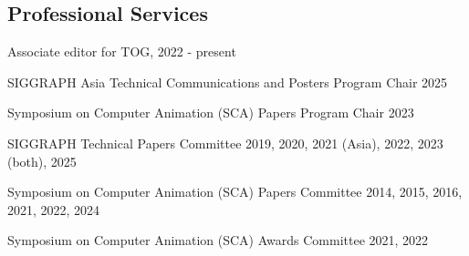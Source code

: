 \documentclass[margin,line]{res}
\newenvironment{list2}{
  \begin{list}{$\bullet$}{%
      \setlength{\itemsep}{0in}
      \setlength{\parsep}{0in} \setlength{\parskip}{0in}
      \setlength{\topsep}{0in} \setlength{\partopsep}{0in} 
      \setlength{\leftmargin}{0.2in}}}{\end{list}}
\begin{document}
\begin{resume}



\section{\sc Professional Services}
Associate editor for TOG, 2022 - present

\vspace*{-.15in}
SIGGRAPH Asia Technical Communications and Posters Program Chair 2025

\vspace*{-.15in}
Symposium on Computer Animation (SCA) Papers Program Chair 2023

\vspace*{-.15in}
SIGGRAPH Technical Papers Committee 2019, 2020, 2021 (Asia), 2022, 2023 (both), 2025

\vspace*{-.15in}
Symposium on Computer Animation (SCA) Papers Committee 2014, 2015, 2016, 2021, 2022, 2024

\vspace*{-.15in}
Symposium on Computer Animation (SCA) Awards Committee 2021, 2022


\end{resume}
\end{document}
